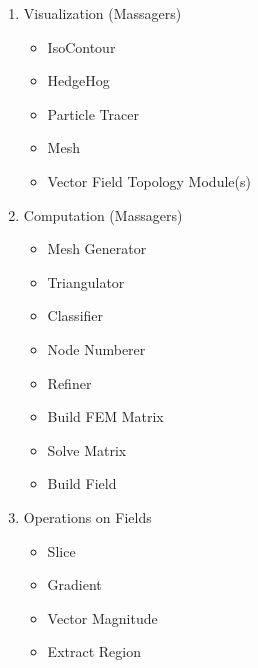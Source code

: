 \begin{enumerate}
\item Visualization (Massagers)
\begin{itemize}
\item IsoContour
\item HedgeHog
\item Particle Tracer
\item Mesh
\item Vector Field Topology Module(s)
\end{itemize}

\item Computation (Massagers)
\begin{itemize}
\item Mesh Generator
\item Triangulator
\item Classifier
\item Node Numberer
\item Refiner
\item Build FEM Matrix
\item Solve Matrix
\item Build Field
\end{itemize}

\item Operations on Fields
\begin{itemize}
\item Slice
\item Gradient
\item Vector Magnitude
\item Extract Region
\end{itemize}

\end{enumerate}


